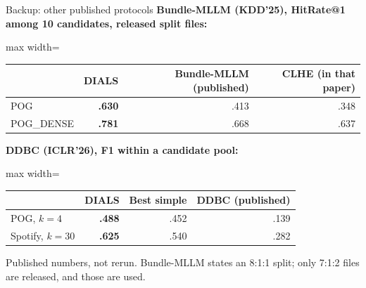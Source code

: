 \documentclass[10pt,aspectratio=169]{beamer}
\newcommand{\key}[1]{\textcolor{Accent}{\textbf{#1}}}
\newcommand{\fn}[1]{\textcolor{Muted}{\scriptsize #1}}
\begin{document}
\begin{frame}{Backup: other published protocols}
\small
\textbf{Bundle-MLLM (KDD'25), HitRate@1 among 10 candidates, released split files:}\par\vspace{1mm}
\centering\renewcommand{\arraystretch}{1.25}
\begin{adjustbox}{max width=\textwidth}\begin{tabular}{lrrr}\toprule
& \key{DIALS} & Bundle-MLLM (published) & CLHE (in that paper)\\\midrule
POG & \textbf{.630} & .413 & .348\\
POG\_DENSE & \textbf{.781} & .668 & .637\\\bottomrule
\end{tabular}\end{adjustbox}\par
\vspace{4mm}\raggedright
\textbf{DDBC (ICLR'26), F1 within a candidate pool:}\par\vspace{1mm}
\centering
\begin{adjustbox}{max width=\textwidth}\begin{tabular}{lrrr}\toprule
& \key{DIALS} & Best simple & DDBC (published)\\\midrule
POG, $k=4$ & \textbf{.488} & .452 & .139\\
Spotify, $k=30$ & \textbf{.625} & .540 & .282\\\bottomrule
\end{tabular}\end{adjustbox}\par
\raggedright\vspace{2mm}
\fn{Published numbers, not rerun. Bundle-MLLM states an 8:1:1 split; only 7:1:2 files are released, and those are used.}
\end{frame}
\end{document}
